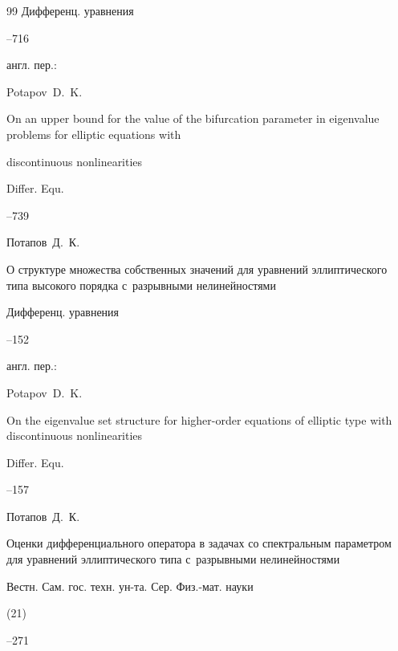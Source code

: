 \begin{thebibliography}{99}
\jour Дифференц. уравнения




--716

\transl  англ. пер.:~

\by Potapov~D.~K.

\paper On an upper bound for the value of the  bifurcation parameter in eigenvalue problems for elliptic equations with

 discontinuous nonlinearities

 \jour Differ. Equ.




 --739

 


\by Потапов~Д.~К.

\paper О структуре множества собственных значений для уравнений  эллиптического типа высокого порядка с~разрывными нелинейностями

\jour Дифференц. уравнения




--152

\transl  англ. пер.:~

\by Potapov~D.~K.

\paper On the eigenvalue set structure for higher-order   equations of elliptic type with discontinuous nonlinearities

\jour Differ. Equ.




--157




\by Потапов~Д.~К.

\paper Оценки дифференциального оператора в задачах со спектральным  параметром для уравнений эллиптического типа с~разрывными нелинейностями

\jour Вестн. Сам. гос. техн. ун-та. Сер. Физ.-мат. науки


(21)

--271


\end{thebibliography}
